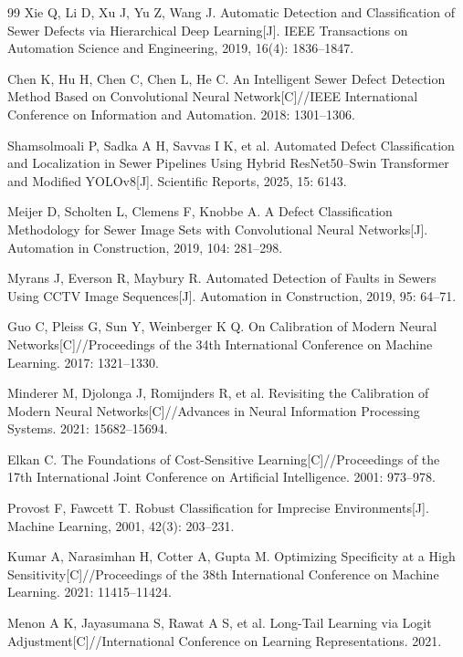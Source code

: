 \documentclass[UTF8,openany,12pt]{ctexbook}
\begin{document}
\begin{thebibliography}{99}
Xie Q, Li D, Xu J, Yu Z, Wang J. Automatic Detection and Classification of Sewer Defects via Hierarchical Deep Learning[J]. IEEE Transactions on Automation Science and Engineering, 2019, 16(4): 1836--1847.

Chen K, Hu H, Chen C, Chen L, He C. An Intelligent Sewer Defect Detection Method Based on Convolutional Neural Network[C]//IEEE International Conference on Information and Automation. 2018: 1301--1306.

Shamsolmoali P, Sadka A H, Savvas I K, et al. Automated Defect Classification and Localization in Sewer Pipelines Using Hybrid ResNet50--Swin Transformer and Modified YOLOv8[J]. Scientific Reports, 2025, 15: 6143.

Meijer D, Scholten L, Clemens F, Knobbe A. A Defect Classification Methodology for Sewer Image Sets with Convolutional Neural Networks[J]. Automation in Construction, 2019, 104: 281--298.

Myrans J, Everson R, Maybury R. Automated Detection of Faults in Sewers Using CCTV Image Sequences[J]. Automation in Construction, 2019, 95: 64--71.

Guo C, Pleiss G, Sun Y, Weinberger K Q. On Calibration of Modern Neural Networks[C]//Proceedings of the 34th International Conference on Machine Learning. 2017: 1321--1330.

Minderer M, Djolonga J, Romijnders R, et al. Revisiting the Calibration of Modern Neural Networks[C]//Advances in Neural Information Processing Systems. 2021: 15682--15694.

Elkan C. The Foundations of Cost-Sensitive Learning[C]//Proceedings of the 17th International Joint Conference on Artificial Intelligence. 2001: 973--978.

Provost F, Fawcett T. Robust Classification for Imprecise Environments[J]. Machine Learning, 2001, 42(3): 203--231.

Kumar A, Narasimhan H, Cotter A, Gupta M. Optimizing Specificity at a High Sensitivity[C]//Proceedings of the 38th International Conference on Machine Learning. 2021: 11415--11424.

Menon A K, Jayasumana S, Rawat A S, et al. Long-Tail Learning via Logit Adjustment[C]//International Conference on Learning Representations. 2021.


\end{thebibliography}
\end{document}
